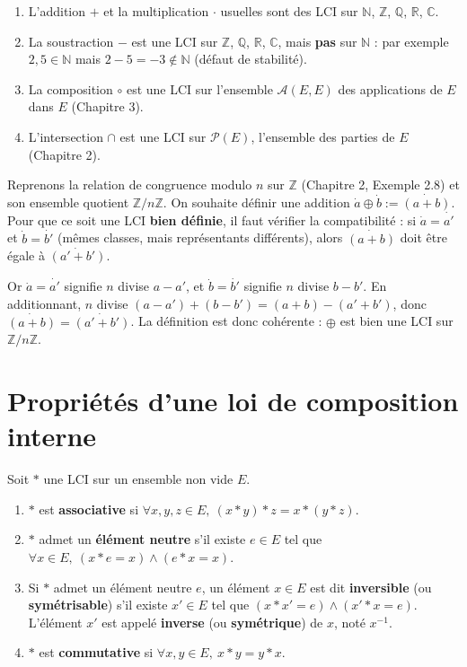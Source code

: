 \documentclass[a4paper,12pt,openany]{book}
\begin{document}
\begin{exemple}[4.1]
\begin{enumerate}
  \item L'addition $+$ et la multiplication $\cdot$ usuelles sont des LCI
  sur $\mathbb{N}$, $\mathbb{Z}$, $\mathbb{Q}$, $\mathbb{R}$, $\mathbb{C}$.
  \item La soustraction $-$ est une LCI sur $\mathbb{Z}$, $\mathbb{Q}$,
  $\mathbb{R}$, $\mathbb{C}$, mais \textbf{pas} sur $\mathbb{N}$ : par
  exemple $2,5\in\mathbb{N}$ mais $2-5=-3\notin\mathbb{N}$ (défaut de
  stabilité).
  \item La composition $\circ$ est une LCI sur l'ensemble
  $\mathcal{A}(E,E)$ des applications de $E$ dans $E$ (Chapitre 3).
  \item L'intersection $\cap$ est une LCI sur $\mathcal{P}(E)$, l'ensemble
  des parties de $E$ (Chapitre 2).
\end{enumerate}
\end{exemple}

\begin{exemple}
Reprenons la relation de congruence modulo $n$ sur $\mathbb{Z}$ (Chapitre 2,
Exemple 2.8) et son ensemble quotient $\mathbb{Z}/n\mathbb{Z}$. On souhaite
définir une addition $\dot a \oplus \dot b := \dot{(a+b)}$. Pour que ce soit
une LCI \textbf{bien définie}, il faut vérifier la compatibilité : si
$\dot a = \dot{a'}$ et $\dot b = \dot{b'}$ (mêmes classes, mais
représentants différents), alors $\dot{(a+b)}$ doit être égale à
$\dot{(a'+b')}$.

Or $\dot a=\dot{a'}$ signifie $n$ divise $a-a'$, et $\dot b=\dot{b'}$
signifie $n$ divise $b-b'$. En additionnant, $n$ divise
$(a-a')+(b-b') = (a+b)-(a'+b')$, donc $\dot{(a+b)} = \dot{(a'+b')}$. La
définition est donc cohérente : $\oplus$ est bien une LCI sur
$\mathbb{Z}/n\mathbb{Z}$.
\end{exemple}

\section{Propriétés d'une loi de composition interne}


\begin{definition}[4.2]
Soit $*$ une LCI sur un ensemble non vide $E$.
\begin{enumerate}
  \item $*$ est \textbf{associative} si
  $\forall x,y,z\in E,\ (x*y)*z = x*(y*z)$.
  \item $*$ admet un \textbf{élément neutre} s'il existe $e\in E$ tel que
  $\forall x\in E,\ (x*e=x) \wedge (e*x=x)$.
  \item Si $*$ admet un élément neutre $e$, un élément $x\in E$ est dit
  \textbf{inversible} (ou \textbf{symétrisable}) s'il existe $x'\in E$ tel
  que $(x*x'=e)\wedge(x'*x=e)$. L'élément $x'$ est appelé
  \textbf{inverse} (ou \textbf{symétrique}) de $x$, noté $x^{-1}$.
  \item $*$ est \textbf{commutative} si $\forall x,y\in E,\ x*y=y*x$.
\end{enumerate}
\end{definition}
\end{document}
